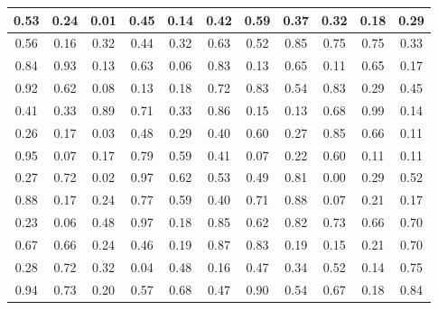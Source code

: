 \documentclass[12pt]{tiet-question-paper}
\begin{document}
\begin{center}
\begin{tabular}{|c|c|c|c|c|c|c|c|c|c|c|}
\hline
0.53 & 0.24 & 0.01 & 0.45 & 0.14 & 0.42 & 0.59 & 0.37 & 0.32 & 0.18 & 0.29\\[0pt]
\hline
0.56 & 0.16 & 0.32 & 0.44 & 0.32 & 0.63 & 0.52 & 0.85 & 0.75 & 0.75 & 0.33\\[0pt]
\hline
0.84 & 0.93 & 0.13 & 0.63 & 0.06 & 0.83 & 0.13 & 0.65 & 0.11 & 0.65 & 0.17\\[0pt]
\hline
0.92 & 0.62 & 0.08 & 0.13 & 0.18 & 0.72 & 0.83 & 0.54 & 0.83 & 0.29 & 0.45\\[0pt]
\hline
0.41 & 0.33 & 0.89 & 0.71 & 0.33 & 0.86 & 0.15 & 0.13 & 0.68 & 0.99 & 0.14\\[0pt]
\hline
0.26 & 0.17 & 0.03 & 0.48 & 0.29 & 0.40 & 0.60 & 0.27 & 0.85 & 0.66 & 0.11\\[0pt]
\hline
0.95 & 0.07 & 0.17 & 0.79 & 0.59 & 0.41 & 0.07 & 0.22 & 0.60 & 0.11 & 0.11\\[0pt]
\hline
0.27 & 0.72 & 0.02 & 0.97 & 0.62 & 0.53 & 0.49 & 0.81 & 0.00 & 0.29 & 0.52\\[0pt]
\hline
0.88 & 0.17 & 0.24 & 0.77 & 0.59 & 0.40 & 0.71 & 0.88 & 0.07 & 0.21 & 0.17\\[0pt]
\hline
0.23 & 0.06 & 0.48 & 0.97 & 0.18 & 0.85 & 0.62 & 0.82 & 0.73 & 0.66 & 0.70\\[0pt]
\hline
0.67 & 0.66 & 0.24 & 0.46 & 0.19 & 0.87 & 0.83 & 0.19 & 0.15 & 0.21 & 0.70\\[0pt]
\hline
0.28 & 0.72 & 0.32 & 0.04 & 0.48 & 0.16 & 0.47 & 0.34 & 0.52 & 0.14 & 0.75\\[0pt]
\hline
0.94 & 0.73 & 0.20 & 0.57 & 0.68 & 0.47 & 0.90 & 0.54 & 0.67 & 0.18 & 0.84\\[0pt]
\hline
\end{tabular}
\end{center}

\vfill
\bvrhrule
\bvrskipline[-0.85]
\bvrhrule
\end{document}
